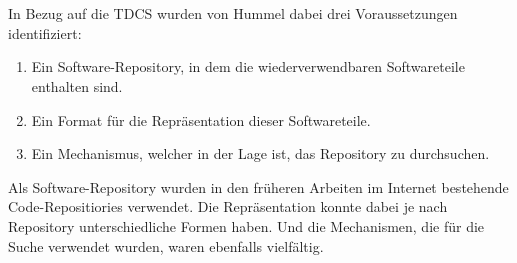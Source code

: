 \\\\
In Bezug auf die TDCS wurden von Hummel\cite{hummel08} dabei drei Voraussetzungen identifiziert:
\begin{enumerate}
\item Ein Software-Repository, in dem die wiederverwendbaren Softwareteile enthalten sind.
\item Ein Format für die Repräsentation dieser Softwareteile.
\item Ein Mechanismus, welcher in der Lage ist, das Repository zu durchsuchen.
\end{enumerate}
\noindent
Als Software-Repository wurden in den früheren Arbeiten im Internet bestehende Code-Repositiories verwendet. Die Repräsentation konnte dabei je nach Repository unterschiedliche Formen haben. Und die Mechanismen, die für die Suche verwendet wurden, waren ebenfalls vielfältig.

